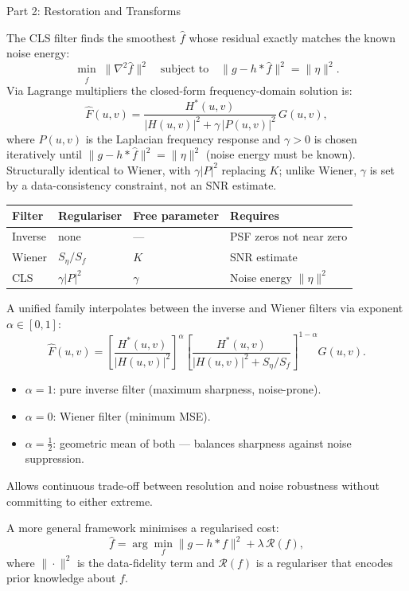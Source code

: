 \documentclass[letterpaper]{article}
\begin{document}
\begin{notes}{Part 2: Restoration and Transforms}

The CLS filter finds the smoothest $\hat{f}$ whose residual exactly matches the known noise energy:
$$\min_{\hat{f}}\;\|\nabla^2\hat{f}\|^2 \quad\text{subject to}\quad \|g - h*\hat{f}\|^2 = \|\eta\|^2.$$
Via Lagrange multipliers the closed-form frequency-domain solution is:
$$\hat{F}(u,v) = \frac{H^*(u,v)}{|H(u,v)|^2 + \gamma\,|P(u,v)|^2}\,G(u,v),$$
where $P(u,v)$ is the Laplacian frequency response and $\gamma>0$ is chosen iteratively until $\|g-h*\hat{f}\|^2 = \|\eta\|^2$ (noise energy must be known). Structurally identical to Wiener, with $\gamma|P|^2$ replacing $K$; unlike Wiener, $\gamma$ is set by a data-consistency constraint, not an SNR estimate.

\begin{center}
\begin{tabular}{@{}llll@{}}
\toprule
Filter & Regulariser & Free parameter & Requires \\
\midrule
Inverse   & none            & ---    & PSF zeros not near zero \\
Wiener    & $S_\eta/S_f$    & $K$    & SNR estimate \\
CLS       & $\gamma|P|^2$   & $\gamma$ & Noise energy $\|\eta\|^2$ \\
\bottomrule
\end{tabular}
\end{center}


A unified family interpolates between the inverse and Wiener filters via exponent $\alpha\in[0,1]$:
$$\hat{F}(u,v) = \left[\frac{H^*(u,v)}{|H(u,v)|^2}\right]^\alpha \!\!\left[\frac{H^*(u,v)}{|H(u,v)|^2 + S_\eta/S_f}\right]^{1-\alpha}\!\! G(u,v).$$
\begin{itemize}
    \item $\alpha=1$: pure inverse filter (maximum sharpness, noise-prone).
    \item $\alpha=0$: Wiener filter (minimum MSE).
    \item $\alpha=\tfrac{1}{2}$: geometric mean of both — balances sharpness against noise suppression.
\end{itemize}
Allows continuous trade-off between resolution and noise robustness without committing to either extreme.


A more general framework minimises a regularised cost:
$$\hat{f} = \arg\min_f \|g - h*f\|^2 + \lambda\,\mathcal{R}(f),$$
where $\|\cdot\|^2$ is the data-fidelity term and $\mathcal{R}(f)$ is a regulariser that encodes prior knowledge about $f$.


\end{notes}
\end{document}
